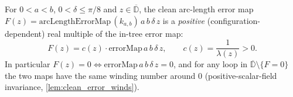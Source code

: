 \begin{lemma}

\leanok
[Arc-length closure of the clean bicircle $=$ positive multiple of \texttt{errorMap}]
  \label{lem:arclength_error_clean_eq_errorMap}
  For $0<a<b$, $0<\delta\le\pi/8$ and $z\in\overline{\mathbb{D}}$, the clean
  arc-length error map $F(z)=\mathrm{arcLengthErrorMap}\,(k_{a,b})\,a\,b\,\delta\,z$
  is a \emph{positive} (configuration-dependent) real multiple of the in-tree error
  map:
  \[
    F(z)=c(z)\cdot\mathrm{errorMap}\,a\,b\,\delta\,z,\qquad c(z)=\frac1{\lambda(z)}>0 .
  \]
  In particular $F(z)=0\iff\mathrm{errorMap}\,a\,b\,\delta\,z=0$, and for any loop in
  $\overline{\mathbb{D}}\setminus\{F=0\}$ the two maps have the same winding number
  around $0$ (positive-scalar-field invariance, \cref{lem:clean_error_winds}).
\end{lemma}
